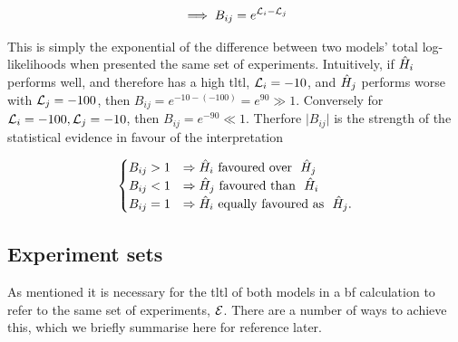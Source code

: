 \begin{equation}
    \label{eqn:bf_succinct}
    \implies B_{ij} = e^{{\mathcal{L}}_{i} - {\mathcal{L}}_{j}}    
\end{equation}


This is simply the exponential of the difference between two models' total log-likelihoods when presented the same set of experiments. 
Intuitively, if $\hat{H}_i$ performs well, and therefore has a high \gls{tltl}, ${\mathcal{L}}_{i}=-10$, 
    and $\hat{H}_j$ performs worse with ${\mathcal{L}}_{j}=-100$, then $B_{ij} = e^{-10-(-100)} = e^{90} \gg 1$.
Conversely for ${\mathcal{L}}_{i}=-100, {\mathcal{L}}_{j}=-10$, then $B_{ij} = e^{-90} \ll 1$. 
Therfore $\lvert B_{ij} \rvert$ is the strength of the statistical evidence
    in favour of the interpretation 

\begin{equation}
    \label{eqn:bf_cases}
    \begin{cases}
        B_{ij} > 1 & \Rightarrow \hat{H}_i \text{\ favoured over \ } \hat{H}_j \\
        B_{ij} < 1 & \Rightarrow \hat{H}_j \text{\ favoured than \ } \hat{H}_i \\
        B_{ij} = 1 & \Rightarrow \hat{H}_i \text{\ equally favoured as \ } \hat{H}_j. \\
    \end{cases}
\end{equation} 

\subsection{Experiment sets}\label{sec:experiments_for_bf}
As mentioned it is necessary for the \gls{tltl} of both models in a \gls{bf} calculation to
    refer to the same set of experiments, ${ \mathcal{E} }$. 
There are a number of ways to achieve this, 
    which we briefly summarise here for reference later. 
\par 

